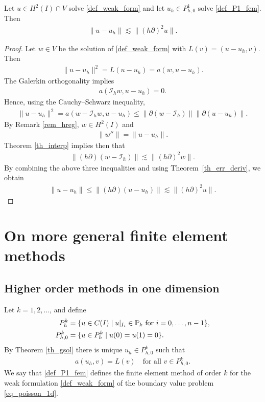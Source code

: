 \documentclass[12pt,oneside,final]{amsart}
\def\p{\partial}
\def\I{\mathcal I}
\begin{document}
\begin{theorem}\label{th_err}
Let $u \in H^2(I) \cap V$ solve \eqref{def_weak_form}
and let $u_h \in P_{h,0}^1$ solve \eqref{def_P1_fem}.
Then
    \begin{align*}
\|u-u_h\|
\lesssim
\|(h \partial)^2 u\|.
    \end{align*}
\end{theorem}
\begin{proof}
Let $w \in V$ be the solution of \eqref{def_weak_form} with $L(v) = (u - u_h,v)$. Then 
    \begin{align*}
\|u-u_h\|^2 = L(u - u_h) = a(w, u - u_h).
    \end{align*}
The Galerkin orthogonality implies
    \begin{align*}
a(\I_h w, u - u_h) = 0.
    \end{align*}
Hence, using the Cauchy--Schwarz inequality,
    \begin{align*}
\|u-u_h\|^2 
= 
a(w - \I_h w, u - u_h) 
\le 
\|\p(w - \I_h)\|\|\p(u-u_h)\|.
    \end{align*}
By Remark \ref{rem_hreg}, $w \in H^2(I)$ and 
    \begin{align*}
\|w''\| = \|u - u_h\|.
    \end{align*}
Theorem \ref{th_interp} implies then that 
    \begin{align*}
\|(h\p)(w - \I_h)\| \lesssim \|(h\p)^2 w\|.
    \end{align*}
By combining the above three inequalities and using Theorem~\ref{th_err_deriv}, we obtain
    \begin{align*}
\|u-u_h\| 
\le 
\|(h\p)(u-u_h)\| 
\lesssim
\|(h \partial)^2 u\|.
    \end{align*}
\end{proof}

\section{On more general finite element methods}

\subsection{Higher order methods in one dimension}

Let $k=1,2,\dots$, and define 
    \begin{align*}
P^k_{h} &= \{ u \in C(I) \mid \text{$u|_{I_{i}} \in \mathbb P_k$ for $i=0,\dots,n-1$} \},
\\\notag
P^k_{h,0} &= \{ u \in P^k_{h} \mid u(0) = u(1) = 0 \}.
    \end{align*} 
By Theorem \ref{th_gsol} there is unique $u_h \in P_{h,0}^k$ such that 
    \begin{align}\label{def_Pk_fem}
a(u_h,v) = L(v) \quad \text{for all $v \in P_{h,0}^k$}.
    \end{align}
We say that \eqref{def_P1_fem} defines the finite element method of order $k$ for the weak formulation \eqref{def_weak_form}
of the boundary value problem \eqref{eq_poisson_1d}.
\end{document}
